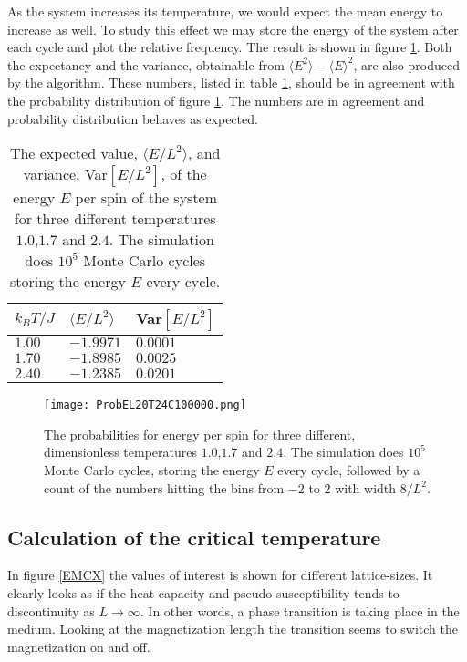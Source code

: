 \documentclass[twoside,utf8]{article}
\newcommand{\expe}[1]{ \langle #1 \rangle }
\begin{document}
\noindent
As the system increases its temperature, we would expect the mean energy to increase as well. To study this effect we may store the energy of the system after each cycle and plot the relative frequency. The result is shown in figure \ref*{P(E)}. Both the expectancy and the variance, obtainable from $\expe{E^2}-\expe{E}^2$, are also produced by the algorithm. These numbers, listed in table \ref*{P(E)tab}, should be in agreement with the probability distribution of figure \ref*{P(E)}. The numbers are in agreement and probability distribution behaves as expected.  


\begin{table}[H]
\caption{
The expected value, $\expe{E/L^2}$, and variance, Var$[E/L^2]$, of the energy $E$ per spin of the system for three different temperatures $1.0$,$1.7$ and $2.4$. The simulation does $10^5$ Monte Carlo cycles storing the energy $E$ every cycle.
}
\label{P(E)tab}
\begin{center}
\begin{tabular}{l l l }
\toprule
$k_B T/J$ 	& $\expe{E/L^2}$ 	& Var$[E/L^2]$ 	\\ \hline 
$1.00$ 		& $-1.9971$ 		& $0.0001$		\\
$1.70$ 		& $-1.8985$ 		& $0.0025$		\\
$2.40$ 		& $-1.2385$ 		& $0.0201$		\\
\bottomrule
\end{tabular}
\end{center}
\end{table}

\begin{figure}[H]
\begin{center}
\texttt{[image: ProbEL20T24C100000.png]}
\end{center}
\caption{
The probabilities for energy per spin for three different, dimensionless temperatures $1.0$,$1.7$ and $2.4$. The simulation does $10^5$ Monte Carlo cycles, storing the energy $E$ every cycle, followed by a count of the numbers hitting the bins from $-2$ to $2$ with width $8/L^2$.
}
\label{P(E)}
\end{figure}




\subsection{Calculation of the critical temperature}
In figure \ref*{EMCX} the values of interest is shown for different lattice-sizes. It clearly looks as if the heat capacity and pseudo-susceptibility tends to discontinuity as $L\rightarrow \infty$. In other words, a phase transition is taking place in the medium. Looking at the magnetization length the transition seems to switch the magnetization on and off.  
\end{document}

